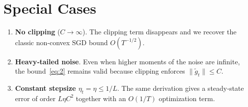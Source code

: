 \documentclass{article}
\begin{document}
\section*{Special Cases}
\begin{enumerate}[label=\arabic*.]
\item \textbf{No clipping} ($C\to\infty$). The clipping term disappears and we recover the classic non‑convex SGD bound $O(T^{-1/2})$.
\item \textbf{Heavy‑tailed noise}. Even when higher moments of the noise are infinite, the bound~\eqref{eq:2} remains valid because clipping enforces $\|\tilde g_t\|\le C$.
\item \textbf{Constant stepsize $\eta_t=\eta\le 1/L$}. The same derivation gives a steady‑state error of order $L\eta C^{2}$ together with an $O(1/T)$ optimization term.
\end{enumerate}
\end{document}
